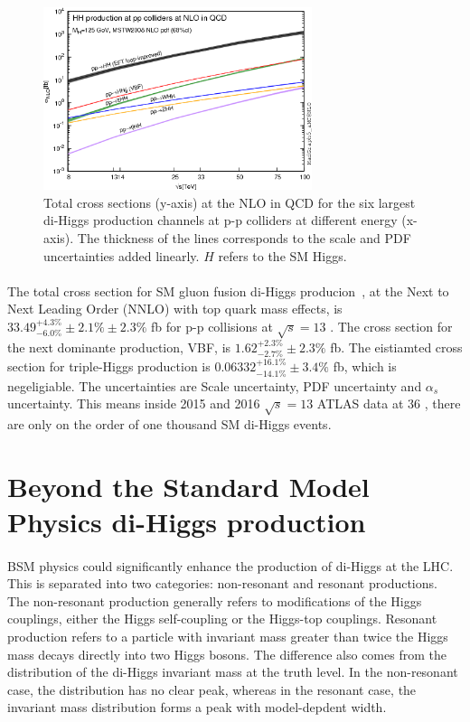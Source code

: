 \begin{figure}[h!]
  \centering
  \captionsetup{justification=centering}
  \includegraphics[width=0.7\textwidth]{figures/theory/HH_xsec}
  \caption{Total cross sections (y-axis) at the NLO in QCD for the six largest di-Higgs production channels at p-p colliders at different energy (x-axis). The thickness of the lines corresponds to the scale and PDF uncertainties added linearly. $H$ refers to the SM Higgs.}
  \label{fig:SM_HH_xsec}
\end{figure}

\paragraph{}
The total cross section for SM gluon fusion di-Higgs producion~\cite{LHCYellow}, at the Next to Next Leading Order (NNLO) with top quark mass effects, is $33.49^{+ 4.3 \%}_{-6.0 \%} \pm 2.1\% \pm 2.3\%$ fb for p-p collisions at $\sqrt{s}=13$ \TeV. The cross section for the next dominante production, VBF, is $1.62^{+ 2.3 \%}_{-2.7 \%} \pm 2.3\%$ fb. The eistiamted cross section for triple-Higgs production is $0.06332 ^{+ 16.1 \%}_{-14.1 \%} \pm 3.4\% $ fb, which is negeligiable. The uncertainties are Scale uncertainty, PDF uncertainty and $\alpha_s$ uncertainty. This means inside 2015 and 2016 $\sqrt{s}=13$ \TeV ATLAS data at 36 \ifb, there are only on the order of one thousand SM di-Higgs events.


\section{Beyond the Standard Model Physics di-Higgs production}
\paragraph{}
BSM physics could significantly enhance the production of di-Higgs at the LHC. This is separated into two categories: non-resonant and resonant productions. The non-resonant production generally refers to modifications of the Higgs couplings, either the Higgs self-coupling or the Higgs-top couplings. Resonant production refers to a particle with invariant mass greater than twice the Higgs mass decays directly into two Higgs bosons. The difference also comes from the distribution of the di-Higgs invariant mass at the truth level. In the non-resonant case, the distribution has no clear peak, whereas in the resonant case, the invariant mass distribution forms a peak with model-depdent width.

